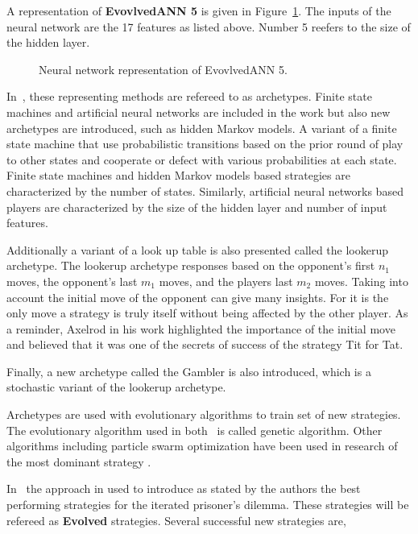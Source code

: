 \documentclass{article}
\begin{document}
A representation of \textbf{EvovlvedANN 5} is given in Figure~\ref{fig:ann_5_neural}. 
The inputs of the neural network are the 17 features as listed above. Number 5 
reefers to the size of the hidden layer.

\begin{figure}[!hbtp]
    \centering
    
    \caption{Neural network representation of EvovlvedANN 5.}
    \label{fig:ann_5_neural}
\end{figure}

In~\cite{Knight2017}, these representing methods are refereed to as archetypes.
Finite state machines and artificial neural networks are included in the
work but also new archetypes are introduced, such as hidden Markov models. A variant
of a finite state machine that use probabilistic transitions based on the prior
round of play to other states and cooperate or defect with various probabilities
at each state. Finite state machines and hidden Markov models 
based strategies are characterized
by the number of states. Similarly, artificial neural networks based players
are characterized by the size of the hidden layer and number of input features.

Additionally a variant of a look up table is also presented called the lookerup 
archetype. The lookerup archetype responses based on the opponent's first \(n_1\)
moves, the opponent's last \(m_1\) moves, and the players last \(m_2\) moves.
Taking into account the initial move of the opponent can give many insights. 
For it is the only move a strategy is truly itself without being affected by
the other player. As a reminder, Axelrod in his work 
highlighted the importance of the initial move and believed that it was one
of the secrets of success of the strategy Tit for Tat.

Finally, a new archetype called the Gambler is also introduced, which is a 
stochastic variant of the lookerup archetype.

Archetypes are used with evolutionary algorithms to train set of 
new strategies. The evolutionary algorithm used in both~\cite{Axelrod1987,
Gaudesi2016} is called genetic algorithm. Other algorithms including particle
swarm optimization have been used in research of the most dominant strategy
\cite{Franken2005}.

In~\cite{Knight2017} the approach in used to introduce as stated
by the authors the best performing strategies for the iterated prisoner's dilemma.
These strategies will be refereed  as \textbf{Evolved} strategies.
Several successful new strategies are,
\end{document}
